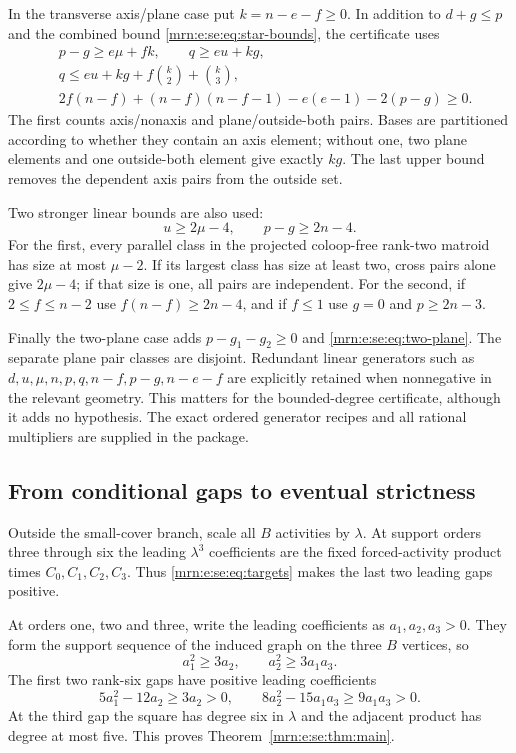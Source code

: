 \documentclass[11pt,a4paper]{article}
\theoremstyle{remark}\newtheorem{remark}[theorem]{Remark}
\begin{document}
In the transverse axis/plane case put $k=n-e-f\ge0$. In addition to $d+g\le p$ and the combined bound \eqref{mrn:e:se:eq:star-bounds}, the certificate uses
\begin{align*}
 &p-g\ge e\mu+fk,\qquad q\ge eu+kg,\\
 &q\le eu+kg+f\binom{k}{2}+\binom{k}{3},\\
 &2f(n-f)+(n-f)(n-f-1)-e(e-1)-2(p-g)\ge0.
\end{align*}
The first counts axis/nonaxis and plane/outside-both pairs. Bases are partitioned according to whether they contain an axis element; without one, two plane elements and one outside-both element give exactly $kg$. The last upper bound removes the dependent axis pairs from the outside set.

Two stronger linear bounds are also used:
\[
 u\ge2\mu-4,\qquad p-g\ge2n-4.
\]
For the first, every parallel class in the projected coloop-free rank-two matroid has size at most $\mu-2$. If its largest class has size at least two, cross pairs alone give $2\mu-4$; if that size is one, all pairs are independent. For the second, if $2\le f\le n-2$ use $f(n-f)\ge2n-4$, and if $f\le1$ use $g=0$ and $p\ge2n-3$.

Finally the two-plane case adds $p-g_1-g_2\ge0$ and \eqref{mrn:e:se:eq:two-plane}. The separate plane pair classes are disjoint. Redundant linear generators such as $d,u,\mu,n,p,q,n-f,p-g,n-e-f$ are explicitly retained when nonnegative in the relevant geometry. This matters for the bounded-degree certificate, although it adds no hypothesis. The exact ordered generator recipes and all rational multipliers are supplied in the package.

\subsection{From conditional gaps to eventual strictness}
Outside the small-cover branch, scale all $B$ activities by $\lambda$. At support orders three through six the leading $\lambda^3$ coefficients are the fixed forced-activity product times $C_0,C_1,C_2,C_3$. Thus \eqref{mrn:e:se:eq:targets} makes the last two leading gaps positive.

At orders one, two and three, write the leading coefficients as $a_1,a_2,a_3>0$. They form the support sequence of the induced graph on the three $B$ vertices, so
\[
 a_1^2\ge3a_2,\qquad a_2^2\ge3a_1a_3.
\]
The first two rank-six gaps have positive leading coefficients
\[
 5a_1^2-12a_2\ge3a_2>0,\qquad
 8a_2^2-15a_1a_3\ge9a_1a_3>0.
\]
At the third gap the square has degree six in $\lambda$ and the adjacent product has degree at most five. This proves Theorem~\ref{mrn:e:se:thm:main}.
\end{document}
